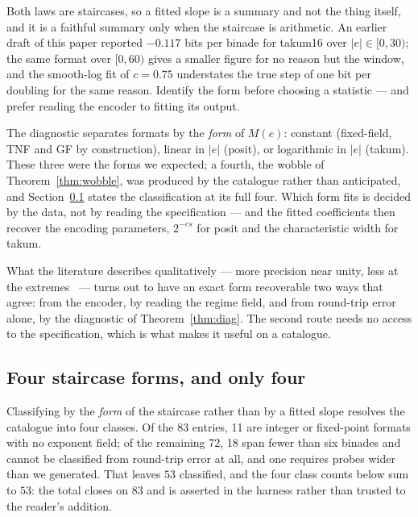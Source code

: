 \begin{corollary}
Both laws are staircases, so a fitted slope is a summary and not the thing itself,
and it is a faithful summary only when the staircase is arithmetic. An earlier
draft of this paper reported $-0.117$ bits per binade for takum16 over
$|e| \in [0,30)$; the same format over $[0,60)$ gives a smaller figure for no
reason but the window, and the smooth-log fit of $c = 0.75$ understates the true
step of one bit per doubling for the same reason. Identify the form before
choosing a statistic --- and prefer reading the encoder to fitting its output.
\end{corollary}

\begin{corollary}
The diagnostic separates formats by the \emph{form} of $M(e)$: constant
(fixed-field, TNF and GF by construction), linear in $|e|$ (posit), or
logarithmic in $|e|$ (takum). These three were the forms we expected; a fourth,
the wobble of Theorem~\ref{thm:wobble}, was produced by the catalogue rather than
anticipated, and Section~\ref{sec:taxonomy} states the classification at its full
four. Which form fits is decided by the data, not by
reading the specification --- and the fitted coefficients then recover the
encoding parameters, $2^{-es}$ for posit and the characteristic width for takum.
\end{corollary}

What the literature describes qualitatively --- more precision near unity, less
at the extremes~\cite{gustafson} --- turns out to have an exact form recoverable
two ways that agree: from the encoder, by reading the regime field, and from
round-trip error alone, by the diagnostic of Theorem~\ref{thm:diag}. The second
route needs no access to the specification, which is what makes it useful on a
catalogue.


\subsection{Four staircase forms, and only four}\label{sec:taxonomy}



Classifying by the \emph{form} of the staircase rather than by a fitted slope
resolves the catalogue into four classes. Of the 83 entries, 11 are integer or
fixed-point formats with no exponent field; of the remaining 72, 18 span fewer
than six binades and cannot be classified from round-trip error at all, and one
requires probes wider than we generated. That leaves $53$ classified, and the
four class counts below sum to $53$: the total closes on $83$ and is asserted in
the harness rather than trusted to the reader's addition.

